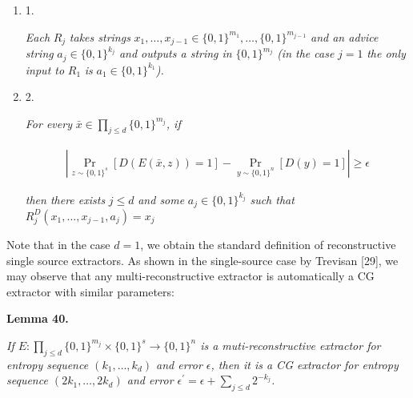 \begin{enumerate}


\item[] 
1. 


\emph{Each }$R_{j}$\emph{ takes strings }$x_{1},\ldots,x_{j-1}\in\{0,1\}^{m_{1}},\ldots,\{0,1\}^{m_{j-1}}$\emph{ and an advice string }$a_{j}\in\{0,1\}^{k_{j}}$\emph{ and outputs a string in }$\{0,1\}^{m_{j}}$\emph{ (in the case }$j=1$\emph{ the only input to }$R_{1}$\emph{ is }$a_{1}\in\{0,1\}^{k_{1}}$\emph{).}\par





\item[] 
2. 


\emph{For every }$\bar{x}\in\prod_{j\leq d}\{0,1\}^{m_{j}}$\emph{, if}\par


\[\begin{gathered}
|\Pr_{z\sim\{0,1\}^{s}}[D(E(\bar{x},z))=1]-\Pr_{y\sim\{0,1\}^{n}}[D(y)=1]|\geq\epsilon
\end{gathered}\]


\emph{then there exists }$j\leq d$\emph{ and some }$a_{j}\in\{0,1\}^{k_{j}}$\emph{ such that }$R^{D}_{j}(x_{1},\ldots,x_{j-1},a_{j})=x_{j}$\emph{}\par





\end{enumerate}






Note that in the case $d=1$, we obtain the standard definition of reconstructive single source extractors. As shown in the single-source case by Trevisan [29], we may observe that any multi-reconstructive extractor is automatically a CG extractor with similar parameters:\par





\par\medskip\noindent\textbf{
\textbf{Lemma 40}\textbf{.}
}\par



\emph{If $E:\prod_{j\leq d}\{0,1\}^{m_{j}}\times\{0,1\}^{s}\to\{0,1\}^{n}$ is a muti-reconstructive extractor for entropy sequence $(k_{1},\ldots,k_{d})$ and error $\epsilon$, then it is a CG extractor for entropy sequence $(2k_{1},\ldots,2k_{d})$ and error $\epsilon^{\prime}=\epsilon+\sum_{j\leq d}2^{-k_{j}}$.}\par



